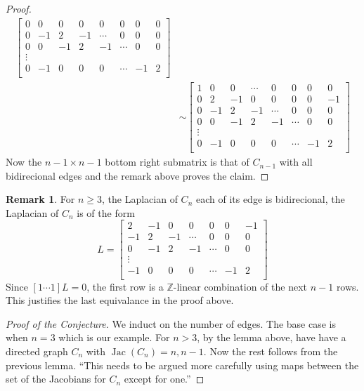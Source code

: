 \documentclass[11pt,reqno]{amsart}
\DeclareMathOperator{\Jac}{Jac}
\newcommand{\Z}{\mathbb{Z}}
\theoremstyle{definition}
\newtheorem{rmk}[mydef]{\textbf{Remark}}
\theoremstyle{plain}
\begin{document}
\begin{proof}
\begin{align}
\begin{bmatrix}
				0 & 0 & 0 & 0 & 0 & 0 & 0 & 0   \\
				0 & -1 & 2 & -1 & \cdots & 0 & 0 & 0 \\
				0 & 0 & -1 & 2 & -1 & \cdots & 0 & 0  \\
				\vdots \\
				0 & -1 & 0 & 0 & 0 & \cdots & -1 & 2 \\
			\end{bmatrix}\\
			&\sim \begin{bmatrix}
				1 & 0 & 0 & \cdots & 0 & 0 & 0 & 0 \\
				0 & 2 & -1 & 0 & 0 & 0 & 0 & -1   \\
				0 & -1 & 2 & -1 & \cdots & 0 & 0 & 0 \\
				0 & 0 & -1 & 2 & -1 & \cdots & 0 & 0  \\
				\vdots \\
				0 & -1 & 0 & 0 & 0 & \cdots & -1 & 2 \\
			\end{bmatrix} \tag{See the remark below for the last equivalance}
			\end{align}
			Now the $n-1 \times n-1$ bottom right submatrix is that of $C_{n-1}$ with all bidirecional edges and the remark above proves the claim.
		\end{proof}

		\begin{rmk}
			For $n \ge 3$, the Laplacian of $C_n$ each of its edge is bidirecional, the Laplacian of $C_n$ is of the form
			$$
			L = 
			\begin{bmatrix}
				2 & -1 & 0 & 0 & 0 & 0 & -1   \\
				-1 & 2 & -1 & \cdots & 0 & 0 & 0 \\
				0 & -1 & 2 & -1 & \cdots & 0 & 0  \\
				\vdots \\
				-1 & 0 & 0 & 0 & \cdots & -1 & 2 \\
			\end{bmatrix}
			$$
			Since $[1 \cdots 1] L = 0$, 
			the first row is a $\Z$-linear combination of the next $n-1$ rows. 
			This justifies the last equivalance in the proof above.  
		\end{rmk}

		\begin{proof}[Proof of the Conjecture]
		We induct on the number of edges. The base case is when $n = 3$ which is our example. 
		For $n > 3$, by the lemma above, have have a directed graph $C_n$ with $\Jac(C_n) = n, n-1$. 
		Now the rest follows from the previous lemma. 
		``This needs to be argued more carefully using maps between the set of the Jacobians for $C_n$ except for one.''
		\end{proof}
			
\end{document}
